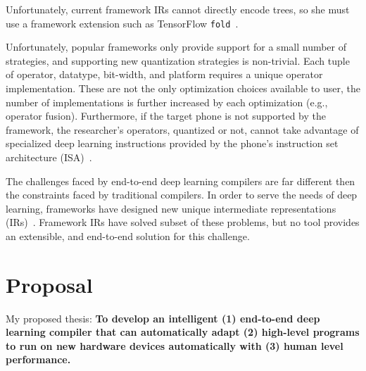 Unfortunately, current framework IRs cannot directly encode trees,
  so she must use a framework extension
  such as TensorFlow \verb|fold|~\citep{tensorflowfold}.

Unfortunately, popular frameworks only provide support for a small number
  of strategies, and supporting new quantization strategies is non-trivial.
Each tuple of operator, datatype, bit-width, and
  platform requires a unique operator implementation.
These are not the only optimization choices available
  to user, the number of implementations is further
  increased by each optimization (e.g., operator fusion).
Furthermore, if the target phone
  is not supported by the framework,
  the researcher's operators,
  quantized or not,
  cannot take advantage of specialized deep learning instructions
  provided by the phone's instruction set architecture (ISA)~\citep{apple_neural_engine}.

The challenges faced by end-to-end deep learning compilers are far
  different then the constraints faced by traditional compilers.
In order to serve the needs of deep learning, frameworks have designed new
  unique intermediate representations (IRs)~\citep{tensorflow, pytorch_ad, chainer_learningsys2015, tangent, theano, glow}.
Framework IRs have solved subset of these problems,
  but no tool provides an extensible,
  and end-to-end solution for this challenge.

\section{Proposal}

My proposed thesis: \textbf{To develop an intelligent (1) end-to-end deep learning compiler that can
automatically adapt (2) high-level programs to run on new hardware devices automatically
with (3) human level performance.}


